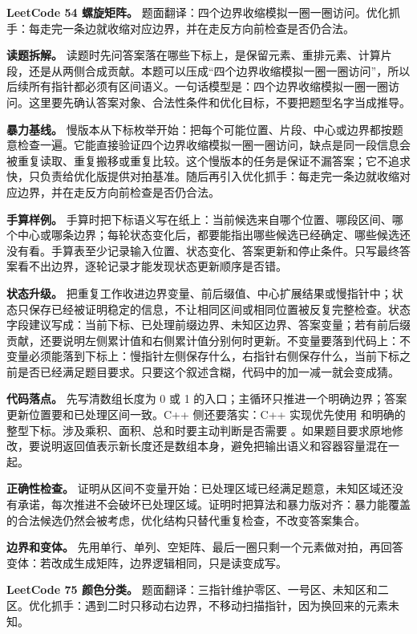 \noindent\textbf{LeetCode 54 螺旋矩阵。} 题面翻译：四个边界收缩模拟一圈一圈访问。优化抓手：每走完一条边就收缩对应边界，并在走反方向前检查是否仍合法。

\textbf{读题拆解。} 读题时先问答案落在哪些下标上，是保留元素、重排元素、计算片段，还是从两侧合成贡献。本题可以压成“四个边界收缩模拟一圈一圈访问”，所以后续所有指针都必须有区间语义。一句话模型是：四个边界收缩模拟一圈一圈访问。这里要先确认答案对象、合法性条件和优化目标，不要把题型名字当成推导。

\textbf{暴力基线。} 慢版本从下标枚举开始：把每个可能位置、片段、中心或边界都按题意检查一遍。它能直接验证四个边界收缩模拟一圈一圈访问，缺点是同一段信息会被重复读取、重复搬移或重复比较。这个慢版本的任务是保证不漏答案；它不追求快，只负责给优化版提供对拍基准。随后再引入优化抓手：每走完一条边就收缩对应边界，并在走反方向前检查是否仍合法。

\textbf{手算样例。} 手算时把下标语义写在纸上：当前候选来自哪个位置、哪段区间、哪个中心或哪条边界；每轮状态变化后，都要能指出哪些候选已经确定、哪些候选还没有看。手算表至少记录输入位置、状态变化、答案更新和停止条件。只写最终答案看不出边界，逐轮记录才能发现状态更新顺序是否错。

\textbf{状态升级。} 把重复工作收进边界变量、前后缀值、中心扩展结果或慢指针中；状态只保存已经被证明稳定的信息，不让相同区间或相同位置被反复完整检查。状态字段建议写成：当前下标、已处理前缀边界、未知区边界、答案变量；若有前后缀贡献，还要说明左侧累计值和右侧累计值分别何时更新。不变量要落到代码上：不变量必须能落到下标上：慢指针左侧保存什么，右指针右侧保存什么，当前下标之前是否已经满足题目要求。只要这个叙述含糊，代码中的加一减一就会变成猜。

\textbf{代码落点。} 先写清数组长度为 0 或 1 的入口；主循环只推进一个明确边界；答案更新位置要和已处理区间一致。C++ 侧还要落实：C++ 实现优先使用  和明确的整型下标。涉及乘积、面积、总和时要主动判断是否需要 。如果题目要求原地修改，要说明返回值表示新长度还是数组本身，避免把输出语义和容器容量混在一起。

\textbf{正确性检查。} 证明从区间不变量开始：已处理区域已经满足题意，未知区域还没有承诺，每次推进不会破坏已处理区域。证明时把算法和暴力版对齐：暴力能覆盖的合法候选仍然会被考虑，优化结构只替代重复检查，不改变答案集合。

\textbf{边界和变体。} 先用单行、单列、空矩阵、最后一圈只剩一个元素做对拍，再回答变体：若改成生成矩阵，边界逻辑相同，只是读变成写。

\noindent\textbf{LeetCode 75 颜色分类。} 题面翻译：三指针维护零区、一号区、未知区和二区。优化抓手：遇到二时只移动右边界，不移动扫描指针，因为换回来的元素未知。

